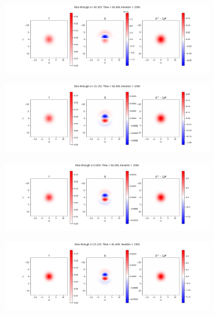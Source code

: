 \documentclass{article}
\begin{document}
\begin{figure}[H]
  \begin{subfigure}[b]{\textwidth}
    \includegraphics[width=\textwidth]{imgs/ts_output2/slice0/mat1500.png}
  \end{subfigure}
  \hfill
  \begin{subfigure}[b]{\textwidth}
    \includegraphics[width=\textwidth]{imgs/ts_output2/slice25/mat1500.png}
  \end{subfigure}
  \hfill
  \begin{subfigure}[b]{\textwidth}
    \includegraphics[width=\textwidth]{imgs/ts_output2/slice50/mat1500.png}
  \end{subfigure}
  \hfill
  \begin{subfigure}[b]{\textwidth}
    \includegraphics[width=\textwidth]{imgs/ts_output2/slice75/mat1500.png}
  \end{subfigure}
\end{figure}
\end{document}
